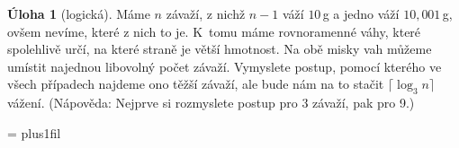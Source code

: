\documentclass[10pt,a4paper]{extarticle}
\newcommand{\hint}[1]{{\color{gray}\footnotesize\noindent(Nápověda: #1)}}
\let\results\newpage
\let\endresults\relax
\theoremstyle{definition}
\newtheorem{uloha}{\atr Úloha}
\def\vysld{}
\let\printvysl\relax
\def\atr{}
\begin{document}
\begin{multicols}{2}
\begin{uloha}[logická]
Máme $n$ závaží, z nichž $n-1$ váží $10$\,g a jedno váží $10{,}001$\,g, ovšem nevíme, které z nich to je. K~tomu máme rovnoramenné váhy, které spolehlivě určí, na které straně je větší hmotnost. Na obě misky vah můžeme umístit najednou libovolný počet závaží. Vymyslete postup, pomocí kterého ve všech případech najdeme ono těžší závaží, ale bude nám na to stačit $\lceil\log_3 n\rceil$ vážení. \hint{Nejprve si rozmyslete postup pro 3 závaží, pak pro 9.}
\end{uloha}

\end{multicols}


\results
\parindent=0pt
\parskip=\smallskipamount
\rightskip=0pt plus1fil\relax
\def\printvysl#1#2{\textbf{#1.} #2\par}
\begin{multicols}{2}
\vysld
\end{multicols}
\endresults
\end{document}
